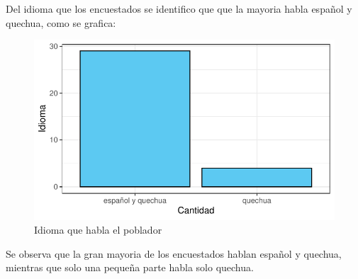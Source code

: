 \documentclass[12pt]{article}\usepackage[]{graphicx}\usepackage[]{xcolor}
\makeatletter
\def\maxwidth{ %
  \ifdim\Gin@nat@width>\linewidth
    \linewidth
  \else
    \Gin@nat@width
  \fi
}
\newenvironment{knitrout}{}{} %
\makeatother
\begin{document}
	Del idioma que los encuestados se identifico que que la mayoria habla español y quechua, como se grafica:
	\begin{figure}[H]
	\centering
\begin{knitrout}
\color{fgcolor}
\includegraphics[width=\maxwidth]{figure/cinco-1} 
\end{knitrout}
	\caption{Idioma que habla el poblador}
	\end{figure}
	Se observa que la gran mayoria de los encuestados hablan español y quechua, mientras que solo una pequeña parte habla solo quechua.
\end{document}
